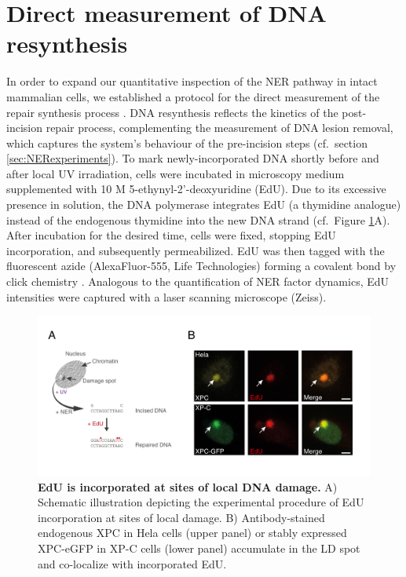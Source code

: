 \section{Direct measurement of DNA resynthesis}
\label{Subsec:EdUmeasurement}

In order to expand our quantitative inspection of the NER pathway in intact mammalian cells, we established a protocol for the direct measurement of the repair synthesis process \cite{Verbruggen2014}. DNA resynthesis reflects the kinetics of the post-incision repair process, complementing the measurement of DNA lesion removal, which captures the system's behaviour of the pre-incision steps (cf.\ section \ref{sec:NERexperiments}). To mark newly-incorporated DNA shortly before and after local UV irradiation, cells were incubated in microscopy medium supplemented with 10 \textmu M 5-ethynyl-2'-deoxyuridine (EdU). Due to its excessive presence in solution, the DNA polymerase integrates EdU (a thymidine analogue) instead of the endogenous thymidine into the new DNA strand (cf.\ Figure \ref{fig:EdU_measurement}A). After incubation for the desired time, cells were fixed, stopping EdU incorporation, and subsequently permeabilized. EdU was then tagged with the fluorescent azide (AlexaFluor-555, Life Technologies) forming a covalent bond by click chemistry \cite{Limsirichaikul2009}. Analogous to the quantification of NER factor dynamics, EdU intensities were captured with a laser scanning microscope (Zeiss).\\
\begin{figure}[b!]
	\begin{center}
		\includegraphics[width=1\textwidth]{Abbildungen/figure2_3.pdf}
		\caption{\textbf{EdU is incorporated at sites of local DNA damage.} A) Schematic illustration depicting the experimental procedure of EdU incorporation at sites of local damage. B) Antibody-stained endogenous XPC in Hela cells (upper panel) or stably expressed XPC-eGFP in XP-C cells (lower panel) accumulate in the LD spot and co-localize with incorporated EdU.}
		\label{fig:EdU_measurement}
	\end{center}
\end{figure}
